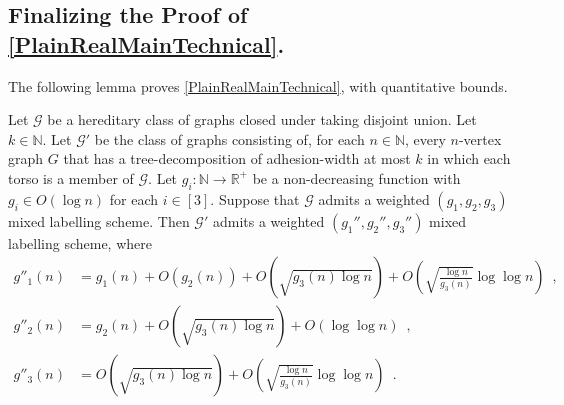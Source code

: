 \documentclass[twoside,leqno]{article}
\newcommand{\R}{\mathbb{R}}
\newcommand{\N}{\mathbb{N}}
\newcommand{\david}[1]{\noindent{\color{orange} DW: #1}}
\newcommand{\vida}[1]{\noindent{\color{pink} VD: #1}}
\newcommand{\Oh}{O}
\begin{document}
\subsection{Finalizing the Proof of \texorpdfstring{\cref{PlainRealMainTechnical}}{Theorem \ref*{PlainRealMainTechnical}}.}
\label{sec:finalizing}

The following lemma proves \cref{PlainRealMainTechnical}, with quantitative bounds.

\begin{lem}\label{RealMainTechnical}
  Let $\mathcal{G}$ be a hereditary class of graphs closed under taking disjoint union.
  Let $k\in\N$.
  Let $\mathcal{G}'$ be the class of graphs consisting of, for each $n\in\N$,  every $n$-vertex graph $G$ that has a tree-decomposition of adhesion-width at most $k$ in which each torso is a member of $\mathcal{G}$.
  Let $g_i:\N\to\R^+$ be a non-decreasing function with $g_i\in\Oh(\log n)$ for each $i\in[3]$.
  Suppose that $\mathcal{G}$ admits a weighted $(g_1,g_2,g_3)$ mixed labelling scheme.
  Then $\mathcal{G}'$ admits a weighted $(g_1'',g_2'',g_3'')$ mixed labelling scheme, where
  \begin{align*}
    g''_1(n)
     & = g_1(n) + \Oh(g_2(n)) + \Oh\left(\sqrt{g_3(n)\log n}\right) + \Oh\left(\sqrt{\frac{\log n}{g_3(n)}}\log\log n\right) \enspace , \\
    g''_2(n)
     & = g_2(n) + \Oh\left(\sqrt{g_3(n)\log n}\right) + \Oh(\log\log n)  \enspace ,                                                     \\
    g''_3(n)
     & = \Oh\left(\sqrt{g_3(n)\log n}\right) + \Oh\left(\sqrt{\frac{\log n}{g_3(n)}}\log\log n\right) \enspace .
  \end{align*}
\end{lem}
\end{document}
